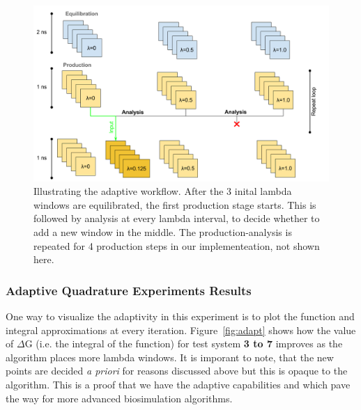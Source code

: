 \begin{figure}
  \centering
   \includegraphics[width=\columnwidth]{figures/Adaptive_TIES_1.png}
  \caption{Illustrating the adaptive workflow. After the 3 inital lambda windows are equilibrated, the first production stage starts. This is followed by analysis at every lambda interval, to decide whether to add a new window in the middle. The production-analysis is repeated for 4 production steps in our implementeation, not shown here.}
\label{fig:adaptive_TIES}
\end{figure}

\subsubsection{Adaptive Quadrature Experiments Results}

One way to visualize the adaptivity in this experiment is to plot the function
and integral approximations at every iteration. Figure~\ref{fig:adapt} shows
how the value of $\Delta$G (i.e. the integral of the function) for test system \textbf{3 to 7} improves as the
algorithm places more lambda windows. It is imporant to note, that the new
points are decided {\it a priori} for reasons discussed above but this is
opaque to the algorithm. This is a proof that we have the adaptive capabilities
and which pave the way for more advanced biosimulation algorithms.

